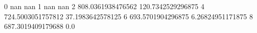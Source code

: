 0 nan nan
1 nan nan
2 808.0361938476562 120.7342529296875
4 724.5003051757812 37.1983642578125
6 693.5701904296875 6.26824951171875
8 687.3019409179688 0.0
